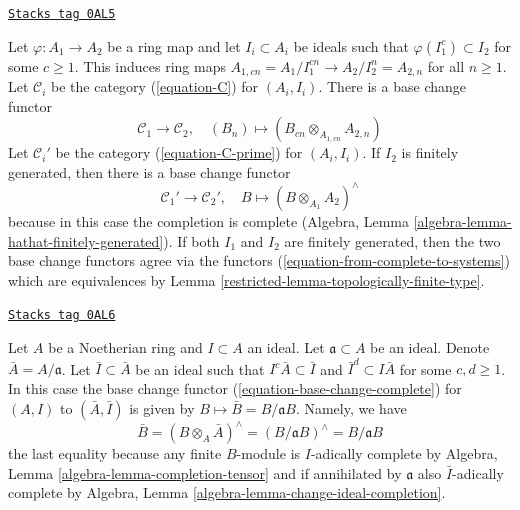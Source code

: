 \begin{remark}

\label{restricted-remark-base-change}
\href{https://stacks.math.columbia.edu/tag/0AL5}{\texttt{Stacks tag 0AL5}}

Let $\varphi : A_1 \to A_2$ be a ring map and let
$I_i \subset A_i$ be ideals such that $\varphi(I_1^c) \subset I_2$
for some $c \geq 1$. This induces ring maps
$A_{1, cn} = A_1/I_1^{cn} \to A_2/I_2^n = A_{2, n}$ for all $n \geq 1$.
Let $\mathcal{C}_i$ be the category (\ref{equation-C}) for $(A_i, I_i)$.
There is a base change functor
\begin{equation}
\label{equation-base-change-systems}
\mathcal{C}_1 \longrightarrow \mathcal{C}_2,\quad
(B_n) \longmapsto (B_{cn} \otimes_{A_{1, cn}} A_{2, n})
\end{equation}
Let $\mathcal{C}_i'$ be the category (\ref{equation-C-prime}) for $(A_i, I_i)$.
If $I_2$ is finitely generated, then there is a base change functor
\begin{equation}
\label{equation-base-change-complete}
\mathcal{C}_1' \longrightarrow \mathcal{C}_2',\quad
B \longmapsto (B \otimes_{A_1} A_2)^\wedge
\end{equation}
because in this case the completion is complete
(Algebra, Lemma \ref{algebra-lemma-hathat-finitely-generated}).
If both $I_1$ and $I_2$ are finitely generated, then
the two base change functors agree via the functors
(\ref{equation-from-complete-to-systems})
which are equivalences by Lemma \ref{restricted-lemma-topologically-finite-type}.
\end{remark}

\begin{remark}

\label{restricted-remark-take-bar}
\href{https://stacks.math.columbia.edu/tag/0AL6}{\texttt{Stacks tag 0AL6}}

Let $A$ be a Noetherian ring and $I \subset A$ an ideal.
Let $\mathfrak a \subset A$ be an ideal. Denote $\bar A = A/\mathfrak a$.
Let $\bar I \subset \bar A$ be an ideal such that
$I^c \bar A \subset \bar I$ and $\bar I^d \subset I\bar A$
for some $c, d \geq 1$. In this case the base change functor
(\ref{equation-base-change-complete}) for $(A, I)$ to $(\bar A, \bar I)$
is given by $B \mapsto \bar B = B/\mathfrak aB$. Namely, we have
\begin{equation}
\label{equation-base-change-to-closed}
\bar B = (B \otimes_A \bar A)^\wedge = (B/\mathfrak a B)^\wedge =
B/\mathfrak a B
\end{equation}
the last equality because any finite $B$-module is $I$-adically complete by
Algebra, Lemma \ref{algebra-lemma-completion-tensor}
and if annihilated by $\mathfrak a$ also $\bar I$-adically complete by
Algebra, Lemma \ref{algebra-lemma-change-ideal-completion}.
\end{remark}

